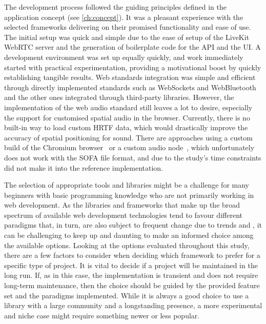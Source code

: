The development process followed the guiding principles defined in the application concept (see \autoref{ch:concept}).
It was a pleasant experience with the selected frameworks delivering on their promised functionality and ease of use.
The initial setup was quick and simple due to the ease of setup of the LiveKit \ac{WebRTC} server and the generation of boilerplate code for the \ac{API} and the \ac{UI}.
A development environment was set up equally quickly, and work immediately started with practical experimentation, providing a motivational boost by quickly establishing tangible results.
Web standards integration was simple and efficient through directly implemented standards such as WebSockets and WebBluetooth and the other ones integrated through third-party libraries.
However, the implementation of the web audio standard still leaves a lot to desire, especially the support for customised spatial audio in the browser.
Currently, there is no built-in way to load custom \ac{HRTF} data, which would drastically improve the accuracy of spatial positioning for sound.
There are approaches using a custom build of the Chromium browser~\parencite{chromiumCustomHrtf} or a custom audio node~\parencite{customHrtfAudioNode}, which unfortunately does not work with the \ac{SOFA} file format, and due to the study's time constraints did not make it into the reference implementation.

The selection of appropriate tools and libraries might be a challenge for many beginners with basic programming knowledge who are not primarily working in web development.
As the libraries and frameworks that make up the broad spectrum of available web development technologies tend to favour different paradigms that, in turn, are also subject to frequent change due to trends and , it can be challenging to keep up and daunting to make an informed choice among the available options.
Looking at the options evaluated throughout this study, there are a few factors to consider when deciding which framework to prefer for a specific type of project.
It is vital to decide if a project will be maintained in the long run.
If, as in this case, the implementation is transient and does not require long-term maintenance, then the choice should be guided by the provided feature set and the paradigms implemented.
While it is always a good choice to use a library with a large community and a longstanding presence, a more experimental and niche case might require something newer or less popular.

